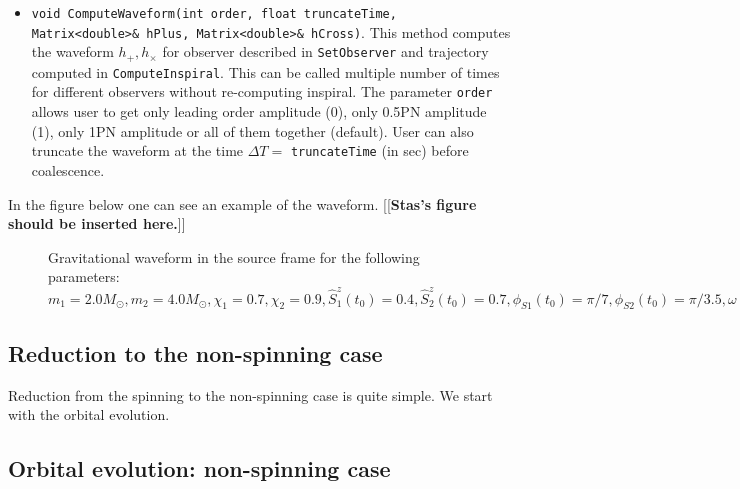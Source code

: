 \documentclass[11pt]{report}
\begin{document}
\begin{itemize}
\item {\tt void ComputeWaveform(int order, float truncateTime, \\ 
Matrix<double>\& hPlus, Matrix<double>\& hCross)}. This method computes the waveform $h_+, h_{\times}$ for observer 
described in {\tt SetObserver} and trajectory computed in {\tt ComputeInspiral}.
This can be called multiple number of times for different observers without 
re-computing inspiral. The parameter {\tt order} allows user to get only leading
order amplitude (0), only 0.5PN amplitude (1), only 1PN amplitude or all of them
together (default). User can also truncate the waveform at the time
$\Delta T = $  {\tt truncateTime} (in sec) before coalescence. 

\end{itemize}

In the figure below one can see an example of the waveform.
[[{\bf Stas's figure should be inserted here.}]]
\begin{figure}[ht]
\caption{Gravitational waveform in the source frame for the 
following parameters: $m_1 = 2.0M_{\odot}, m_2=4.0M_{\odot}, 
\chi_1 = 0.7, \chi_2=0.9, \hat{S}_1^z(t_0) = 0.4, \hat{S}_2^z(t_0) = 0.7,
\phi_{S1}(t_0) = \pi/7, \phi_{S2}(t_0) = \pi/3.5, \omega(t_0) = 40\pi, 
\Phi(t_0)=0, i(t_0) = \pi/7, \alpha(t_0) = \pi/3, \theta=\pi/2.2, D=10^6(pc)$}
\label{fig:waveforms}
\end{figure}


\subsection{Reduction to the non-spinning case}

Reduction from the spinning to the non-spinning case is quite simple.
We start with the orbital evolution. 

\subsection{Orbital evolution: non-spinning case}
\end{document}
